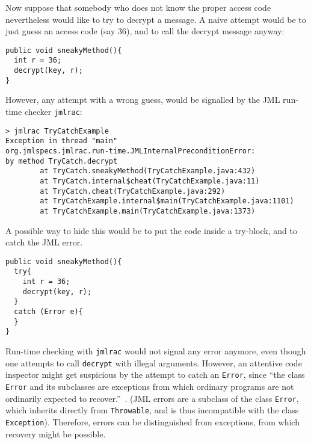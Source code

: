 \documentclass[]{llncs}
\begin{document}
Now suppose that somebody who does not know the proper access code
nevertheless would like to try to decrypt a message. A naive attempt
would be to just guess an access code (say 36), and to call the
decrypt message anyway:

\begin{verbatim}
public void sneakyMethod(){
  int r = 36; 
  decrypt(key, r);                                           
}
\end{verbatim}

However, any attempt with a wrong guess, would be signalled by the JML
run-time checker \texttt{jmlrac}:
\begin{verbatim}
> jmlrac TryCatchExample
Exception in thread "main" 
org.jmlspecs.jmlrac.run-time.JMLInternalPreconditionError: 
by method TryCatch.decrypt
        at TryCatch.sneakyMethod(TryCatchExample.java:432)
        at TryCatch.internal$cheat(TryCatchExample.java:11)
        at TryCatch.cheat(TryCatchExample.java:292)
        at TryCatchExample.internal$main(TryCatchExample.java:1101)
        at TryCatchExample.main(TryCatchExample.java:1373)
\end{verbatim}

A possible way to hide this would be to put the code inside a
try-block, and to catch the JML error.

\begin{verbatim}
public void sneakyMethod(){
  try{ 
    int r = 36; 
    decrypt(key, r);                                           
  }           
  catch (Error e){
  }
}
\end{verbatim}
Run-time checking with \texttt{jmlrac} would not signal any error
anymore, even though one attempts to call \texttt{decrypt} with
illegal arguments. However, an attentive code inspector might get
suspicious by the attempt to catch an \texttt{Error}, since ``the
class \texttt{Error} and its subclasses are exceptions from which
ordinary programs are not ordinarily expected to recover.''~\cite[\S
11.5]{GoslingJSB05}. (JML errors are a subclass of the class
\texttt{Error}, which inherits directly from \texttt{Throwable}, and
is thus incompatible with the class \texttt{Exception}). Therefore,
errors can be distinguished from exceptions, from which recovery might
be possible.
\end{document}

